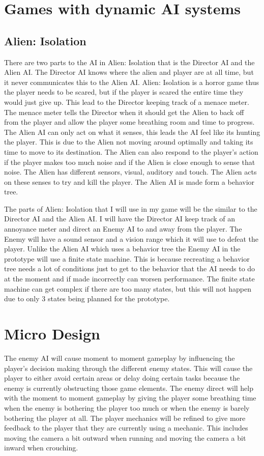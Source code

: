 \documentclass{article}
\begin{document}
\section*{Games with dynamic AI systems}
\subsection*{Alien: Isolation}
There are two parts to the AI in Alien: Isolation that is the Director AI and the
Alien AI. The Director AI knows where the alien and player are at all time, but 
it never communicates this to the Alien AI. 
Alien: Isolation is a horror game thus the player needs to be scared, but if the player
is scared the entire time they would just give up. This lead to the Director keeping track
of a menace meter. The menace meter tells the Director when it should get the Alien to 
back off from the player and allow the player some breathing room and time to progress.
The Alien AI can only act on what it senses, this leads the AI feel like its hunting the
player. This is due to the Alien not moving around optimally and taking its time to move
to its destination. 
The Alien can also respond to the player's action if the player makes too much noise and if
the Alien is close enough to sense that noise.
The Alien has different sensors, visual, auditory and touch. The Alien acts on these senses
to try and kill the player.
The Alien AI is made form a behavior tree.



The parts of Alien: Isolation that I will use in my game will be the similar to the Director AI
and the Alien AI. I will have the Director AI keep track of an annoyance meter and direct an Enemy
AI to and away from the player. The Enemy will have a sound sensor and a vision range which it will
use to defeat the player. Unlike the Alien AI which uses a behavior tree the Enemy AI in the prototype
will use a finite state machine. This is because recreating a behavior tree needs a lot of conditions
just to get to the behavior that the AI needs to do at the moment and if made incorrectly can worsen
performance. The finite state machine can get complex if there are too many states, but this will
not happen due to only 3 states being planned for the prototype.



\section*{Micro Design}
The enemy AI will cause moment to moment gameplay by influencing the
player's decision making through the different enemy states. This will cause
the player to either avoid certain areas or delay doing certain tasks
because the enemy is currently obstructing those game elements.
The enemy direct will help with the moment to moment gameplay by
giving the player some breathing time when the enemy is bothering the player
too much or when the enemy is barely bothering the player at all.
The player mechanics will be refined to give more feedback to the
player that they are currently using a mechanic. This includes moving the camera
a bit outward when running and moving the camera a bit inward when crouching.
\end{document}
